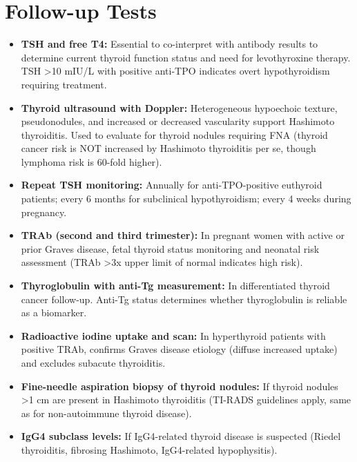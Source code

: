 \section*{Follow-up Tests}
\begin{itemize}
  \item \textbf{TSH and free T4:} Essential to co-interpret with antibody results to determine current thyroid function status and need for levothyroxine therapy. TSH >10 mIU/L with positive anti-TPO indicates overt hypothyroidism requiring treatment.
  \item \textbf{Thyroid ultrasound with Doppler:} Heterogeneous hypoechoic texture, pseudonodules, and increased or decreased vascularity support Hashimoto thyroiditis. Used to evaluate for thyroid nodules requiring FNA (thyroid cancer risk is NOT increased by Hashimoto thyroiditis per se, though lymphoma risk is 60-fold higher).
  \item \textbf{Repeat TSH monitoring:} Annually for anti-TPO-positive euthyroid patients; every 6 months for subclinical hypothyroidism; every 4 weeks during pregnancy.
  \item \textbf{TRAb (second and third trimester):} In pregnant women with active or prior Graves disease, fetal thyroid status monitoring and neonatal risk assessment (TRAb >3x upper limit of normal indicates high risk).
  \item \textbf{Thyroglobulin with anti-Tg measurement:} In differentiated thyroid cancer follow-up. Anti-Tg status determines whether thyroglobulin is reliable as a biomarker.
  \item \textbf{Radioactive iodine uptake and scan:} In hyperthyroid patients with positive TRAb, confirms Graves disease etiology (diffuse increased uptake) and excludes subacute thyroiditis.
  \item \textbf{Fine-needle aspiration biopsy of thyroid nodules:} If thyroid nodules >1 cm are present in Hashimoto thyroiditis (TI-RADS guidelines apply, same as for non-autoimmune thyroid disease).
  \item \textbf{IgG4 subclass levels:} If IgG4-related thyroid disease is suspected (Riedel thyroiditis, fibrosing Hashimoto, IgG4-related hypophysitis).
\end{itemize}

